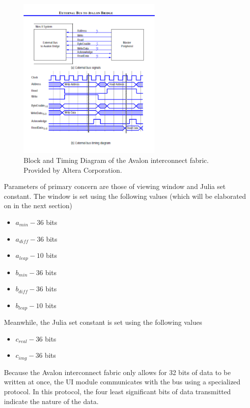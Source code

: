 \documentclass{article}
\begin{document}
\begin{figure}[H]
  \centering
    \includegraphics[width=200pt]{block_diagrams/nbat.pdf}
  \caption{Block and Timing Diagram of the Avalon interconnect fabric. Provided by Altera Corporation.}
\end{figure}

Parameters of primary concern are those of viewing window and Julia set constant. The window is set using the 
following values (which will be elaborated on in the next section)

\begin{itemize}
\item $a_{min} - 36$ bits
\item $a_{diff} - 36$ bits
\item $a_{leap} - 10$ bits
\item $b_{min} - 36$ bits
\item $b_{diff} - 36$ bits
\item $b_{leap} - 10$ bits
\end{itemize}

Meanwhile, the Julia set constant is set using the following values

\begin{itemize}
\item $c_{real} - 36$ bits
\item $c_{img} - 36$ bits
\end{itemize}

Because the Avalon interconnect fabric only allows for 32 bits of data to be written at once, the UI module communicates
with the bus using a specialized protocol. In this protocol, the four least significant bits of data transmitted indicate 
the nature of the data.
\end{document}
